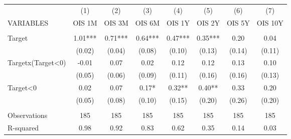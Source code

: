 \begin{tabular}{lccccccc} \hline
 & (1) & (2) & (3) & (4) & (5) & (6) & (7) \\
VARIABLES & OIS 1M & OIS 3M & OIS 6M & OIS 1Y & OIS 2Y & OIS 5Y & OIS 10Y \\ \hline
 &  &  &  &  &  &  &  \\
Target & 1.01*** & 0.71*** & 0.64*** & 0.47*** & 0.35*** & 0.20 & 0.04 \\
 & (0.02) & (0.04) & (0.08) & (0.10) & (0.13) & (0.14) & (0.11) \\
Targetx(Target<0) & -0.01 & 0.07 & 0.02 & 0.12 & 0.12 & 0.13 & 0.10 \\
 & (0.05) & (0.06) & (0.09) & (0.11) & (0.16) & (0.16) & (0.13) \\
Target<0 & 0.02 & 0.07 & 0.17* & 0.32** & 0.40** & 0.33 & 0.20 \\
 & (0.05) & (0.08) & (0.10) & (0.15) & (0.20) & (0.26) & (0.20) \\
 &  &  &  &  &  &  &  \\
Observations & 185 & 185 & 185 & 185 & 185 & 185 & 185 \\
 R-squared & 0.98 & 0.92 & 0.83 & 0.62 & 0.35 & 0.14 & 0.03 \\ \hline
\end{tabular}
